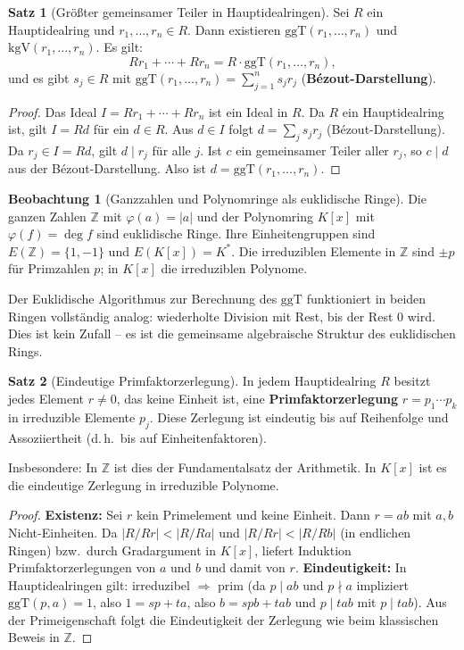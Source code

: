 ﻿\documentclass[a4paper,12pt]{report}
\theoremstyle{definition}
\newtheorem{satz}{Satz}
\newtheorem{beobachtung}{Beobachtung}
\begin{document}
\begin{satz}[Größter gemeinsamer Teiler in Hauptidealringen]
    Sei $R$ ein Hauptidealring und $r_1, \dots, r_n \in R$.
    Dann existieren $\mathrm{ggT}(r_1, \dots, r_n)$ und
    $\mathrm{kgV}(r_1, \dots, r_n)$. Es gilt:
    \[
        R r_1 + \cdots + R r_n = R \cdot \mathrm{ggT}(r_1, \dots, r_n),
    \]
    und es gibt $s_j \in R$ mit
    $\mathrm{ggT}(r_1, \dots, r_n) = \sum_{j=1}^n s_j r_j$
    (\textbf{Bézout-Darstellung}).
\end{satz}
\begin{proof}
    Das Ideal $I = Rr_1 + \cdots + Rr_n$ ist ein Ideal in $R$.
    Da $R$ ein Hauptidealring ist, gilt $I = Rd$ für ein $d \in R$.
    Aus $d \in I$ folgt $d = \sum_j s_j r_j$ (Bézout-Darstellung).
    Da $r_j \in I = Rd$, gilt $d \mid r_j$ für alle $j$.
    Ist $c$ ein gemeinsamer Teiler aller $r_j$, so $c \mid d$ aus der
    Bézout-Darstellung. Also ist $d = \mathrm{ggT}(r_1, \ldots, r_n)$.
\end{proof}

\begin{beobachtung}[Ganzzahlen und Polynomringe als euklidische Ringe]
    Die ganzen Zahlen $\mathbb{Z}$ mit $\varphi(a) = |a|$ und der
    Polynomring $K[x]$ mit $\varphi(f) = \deg f$ sind euklidische Ringe.
    Ihre Einheitengruppen sind $E(\mathbb{Z}) = \{1, -1\}$ und
    $E(K[x]) = K^*$. Die irreduziblen Elemente in $\mathbb{Z}$ sind
    $\pm p$ für Primzahlen $p$; in $K[x]$ die irreduziblen Polynome.

    Der Euklidische Algorithmus zur Berechnung des $\mathrm{ggT}$
    funktioniert in beiden Ringen vollständig analog: wiederholte
    Division mit Rest, bis der Rest $0$ wird. Dies ist kein Zufall --
    es ist die gemeinsame algebraische Struktur des euklidischen Rings.
\end{beobachtung}

\begin{satz}[Eindeutige Primfaktorzerlegung]
    In jedem Hauptidealring $R$ besitzt jedes Element $r \neq 0$,
    das keine Einheit ist, eine \textbf{Primfaktorzerlegung}
    $r = p_1 \cdots p_k$ in irreduzible Elemente $p_j$. Diese
    Zerlegung ist eindeutig bis auf Reihenfolge und Assoziiertheit
    (d.\,h.\ bis auf Einheitenfaktoren).

    Insbesondere: In $\mathbb{Z}$ ist dies der Fundamentalsatz der
    Arithmetik. In $K[x]$ ist es die eindeutige Zerlegung in
    irreduzible Polynome.
\end{satz}
\begin{proof}
    \textbf{Existenz:} Sei $r$ kein Primelement und keine Einheit. Dann
    $r = ab$ mit $a, b$ Nicht-Einheiten. Da $|R/Rr| < |R/Ra|$ und $|R/Rr| < |R/Rb|$
    (in endlichen Ringen) bzw.\ durch Gradargument in $K[x]$, liefert Induktion
    Primfaktorzerlegungen von $a$ und $b$ und damit von $r$.
    \textbf{Eindeutigkeit:} In Hauptidealringen gilt: irreduzibel $\Rightarrow$ prim
    (da $p \mid ab$ und $p \nmid a$ impliziert $\mathrm{ggT}(p, a) = 1$, also
    $1 = sp + ta$, also $b = spb + tab$ und $p \mid tab$ mit $p \mid tab$).
    Aus der Primeigenschaft folgt die Eindeutigkeit der Zerlegung wie beim klassischen
    Beweis in $\mathbb{Z}$.
\end{proof}
\end{document}
